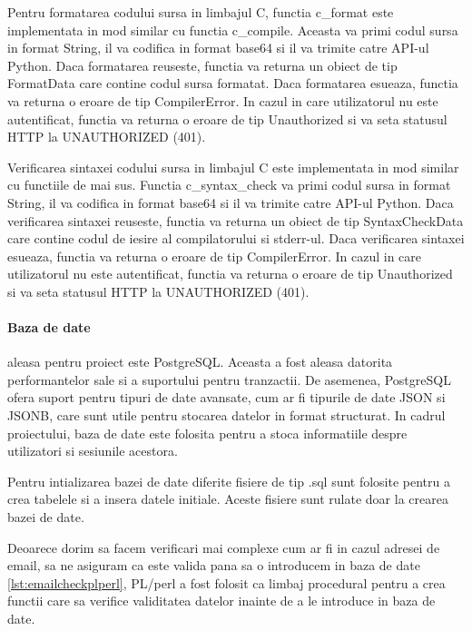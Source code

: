 \documentclass[titlepage,12pt]{article}
\DeclareRobustCommand{\code}[1]{{\ttfamily\small #1}}
\begin{document}
Pentru formatarea codului sursa in limbajul C, functia \code{c\_format} este implementata in mod similar cu functia \code{c\_compile}. Aceasta va primi codul sursa in format \code{String}, il va codifica in format \code{base64} si il va trimite catre API-ul Python. Daca formatarea reuseste, functia va returna un obiect de tip \code{FormatData} care contine codul sursa formatat. Daca formatarea esueaza, functia va returna o eroare de tip \code{CompilerError}. In cazul in care utilizatorul nu este autentificat, functia va returna o eroare de tip \code{Unauthorized} si va seta statusul HTTP la \code{UNAUTHORIZED (401)}.

Verificarea sintaxei codului sursa in limbajul C este implementata in mod similar cu functiile de mai sus. Functia \code{c\_syntax\_check} va primi codul sursa in format \code{String}, il va codifica in format \code{base64} si il va trimite catre API-ul Python. Daca verificarea sintaxei reuseste, functia va returna un obiect de tip \code{SyntaxCheckData} care contine codul de iesire al compilatorului si stderr-ul. Daca verificarea sintaxei esueaza, functia va returna o eroare de tip \code{CompilerError}. In cazul in care utilizatorul nu este autentificat, functia va returna o eroare de tip \code{Unauthorized} si va seta statusul HTTP la \code{UNAUTHORIZED (401)}.

\paragraph{Baza de date} aleasa pentru proiect este \code{PostgreSQL}. Aceasta a fost aleasa datorita performantelor sale si a suportului pentru tranzactii. De asemenea, PostgreSQL ofera suport pentru tipuri de date avansate, cum ar fi tipurile de date JSON si JSONB, care sunt utile pentru stocarea datelor in format structurat. In cadrul proiectului, baza de date este folosita pentru a stoca informatiile despre utilizatori si sesiunile acestora.

Pentru intializarea bazei de date diferite fisiere de tip \code{.sql} sunt folosite pentru a crea tabelele si a insera datele initiale. Aceste fisiere sunt rulate doar la crearea bazei de date.

Deoarece dorim sa facem verificari mai complexe cum ar fi in cazul adresei de email, sa ne asiguram ca este valida pana sa o introducem in baza de date \cref{lst:emailcheckplperl}, \code{PL/perl} a fost folosit ca limbaj procedural pentru a crea functii care sa verifice validitatea datelor inainte de a le introduce in baza de date.
\end{document}
